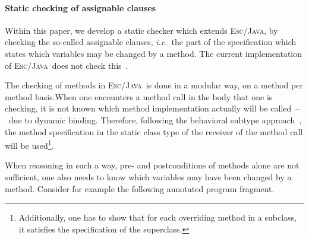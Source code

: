 \documentclass[a4paper]{llncs}
\newcommand{\jml}{\textsc{Jml}}
\newcommand{\escj}{\textsc{Esc/Java}}
\newcommand{\jass}{\textsc{Jass}}
\newcommand{\java}{\textsc{Java}}
\newcommand{\csrc}{\textsc{Compaq Src}}
\begin{document}



\paragraph{\bf{Static checking of assignable clauses}}
Within this paper, we develop a static checker which extends \escj, by
checking the so-called assignable clauses, \emph{i.e.}~the part of the
specification which states which variables may be changed by a
method. The current implementation of \escj\ does not check
this~\cite{Leino01}.

The checking of methods in \escj\ is done in a modular way, on a
method per method basis.When one encounters a method call in the body
that one is checking, it is not known which method implementation
actually will be called~--~due to dynamic binding. Therefore,
following the behavioral subtype approach~\cite{LiskovW94}, the
method specification in the static class type of the receiver of the
method call will be used\footnote{Additionally, one has to show that
for each overriding method in a subclass, it satisfies the
specification of the superclass.}.

When reasoning in such a way, pre- and postconditions of methods alone 
are not sufficient, one also needs to know which variables may have
been changed by a method. Consider for example the following annotated 
program fragment.
\end{document}
